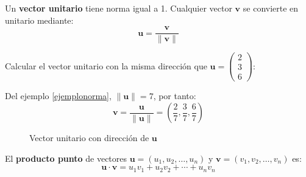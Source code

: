 \begin{definition}
Un \textbf{vector unitario} tiene norma igual a 1. Cualquier vector $\mathbf{v}$ se convierte en unitario mediante:
$$\mathbf{u} = \frac{\mathbf{v}}{\|\mathbf{v}\|}$$
\end{definition}

\begin{example}
Calcular el vector unitario con la misma dirección que $\mathbf{u} = \begin{pmatrix} 2 \\ 3 \\ 6 \end{pmatrix}$:

\begin{myproof}
\begin{multicols}{2}
Del ejemplo \ref{ejemplonorma}, $\|\mathbf{u}\| = 7$, por tanto:
$$\mathbf{v} = \frac{\mathbf{u}}{\|\mathbf{u}\|} = \left(\frac{2}{7}, \frac{3}{7}, \frac{6}{7}\right)$$

\columnbreak
\begin{figure}[H]
\centering
{}
\caption{Vector unitario con dirección de $\mathbf{u}$}
\end{figure}
\end{multicols}
\end{myproof}
\end{example}

\begin{definition}
El \textbf{producto punto} de vectores $\mathbf{u} = (u_1, u_2, \ldots, u_n)$ y $\mathbf{v} = (v_1, v_2, \ldots, v_n)$ es:
$$\mathbf{u} \cdot \mathbf{v} = u_1v_1 + u_2v_2 + \cdots + u_nv_n$$
\end{definition}

